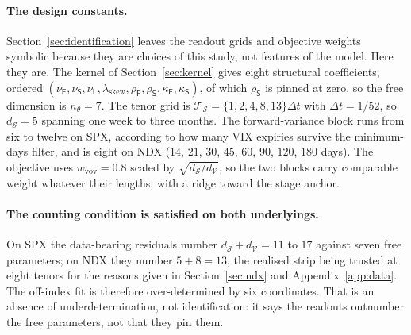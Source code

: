 \documentclass[11pt]{article}
\providecommand{\1}{\mathbf 1}
\begin{document}
\paragraph{The design constants.} Section~\ref{sec:identification} leaves the readout grids and
objective weights symbolic because they are choices of this study, not features of the model. Here
they are. The kernel of Section~\ref{sec:kernel} gives eight structural coefficients, ordered
$(\nu_{\mathsf F},\nu_{\mathsf S},\nu_{\mathsf L},\lambda_{\mathrm{skew}},
\rho_{\mathsf F},\rho_{\mathsf S},\kappa_{\mathsf F},\kappa_{\mathsf S})$, of which
$\rho_{\mathsf S}$ is pinned at zero, so the free dimension is $n_\theta=7$. The tenor grid is
$\mathcal{T}_{\mathcal{S}}=\{1,2,4,8,13\}\Delta t$ with $\Delta t=1/52$, so $d_{\mathcal{S}}=5$
spanning one week to three months. The forward-variance block runs from six to twelve on SPX,
according to how many VIX expiries survive the minimum-days filter, and is eight on NDX
($14$, $21$, $30$, $45$, $60$, $90$, $120$, $180$ days). The objective uses $w_{\mathrm{vov}}=0.8$
scaled by $\sqrt{d_{\mathcal S}/d_{\mathcal V}}$, so the two blocks carry comparable weight whatever
their lengths, with a ridge toward the stage anchor.

\paragraph{The counting condition is satisfied on both underlyings.} On SPX the data-bearing
residuals number $d_{\mathcal{S}}+d_{\mathcal{V}}=11$ to $17$ against seven free parameters; on NDX
they number $5+8=13$, the realised strip being trusted at eight tenors for the reasons given in
Section~\ref{sec:ndx} and Appendix~\ref{app:data}. The off-index fit is therefore over-determined
by six coordinates. That is an absence of underdetermination, not identification: it says the
readouts outnumber the free parameters, not that they pin them.
\end{document}
